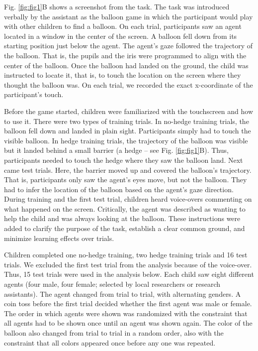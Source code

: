 \documentclass[
  man,floatsintext]{apa7}
\begin{document}
Fig. \ref{fig:fig1}B shows a screenshot from the task. The task was introduced verbally by the assistant as the balloon game in which the participant would play with other children to find a balloon. On each trial, participants saw an agent located in a window in the center of the screen. A balloon fell down from its starting position just below the agent. The agent's gaze followed the trajectory of the balloon. That is, the pupils and the iris were programmed to align with the center of the balloon. Once the balloon had landed on the ground, the child was instructed to locate it, that is, to touch the location on the screen where they thought the balloon was. On each trial, we recorded the exact x-coordinate of the participant's touch.

Before the game started, children were familiarized with the touchscreen and how to use it. There were two types of training trials. In no-hedge training trials, the balloon fell down and landed in plain sight. Participants simply had to touch the visible balloon. In hedge training trials, the trajectory of the balloon was visible but it landed behind a small barrier (a hedge -- see Fig. \ref{fig:fig1}B). Thus, participants needed to touch the hedge where they saw the balloon land. Next came test trials. Here, the barrier moved up and covered the balloon's trajectory. That is, participants only saw the agent's eyes move, but not the balloon. They had to infer the location of the balloon based on the agent's gaze direction. During training and the first test trial, children heard voice-overs commenting on what happened on the screen. Critically, the agent was described as wanting to help the child and was always looking at the balloon. These instructions were added to clarify the purpose of the task, establish a clear common ground, and minimize learning effects over trials.

Children completed one no-hedge training, two hedge training trials and 16 test trials. We excluded the first test trial from the analysis because of the voice-over. Thus, 15 test trials were used in the analysis below. Each child saw eight different agents (four male, four female; selected by local researchers or research assistants). The agent changed from trial to trial, with alternating genders. A coin toss before the first trial decided whether the first agent was male or female. The order in which agents were shown was randomized with the constraint that all agents had to be shown once until an agent was shown again. The color of the balloon also changed from trial to trial in a random order, also with the constraint that all colors appeared once before any one was repeated.
\end{document}
